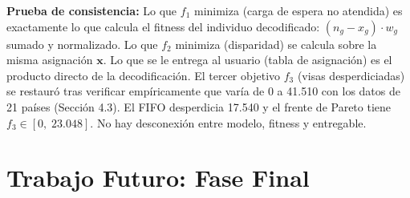 \documentclass[12pt,letterpaper]{article}
\begin{document}
\begin{table}[H]
\centering
\caption{Verificación de coherencia del modelo contra la rúbrica.}
\label{tab:coherencia}
\renewcommand{\arraystretch}{1.5}
\end{table}

\textbf{Prueba de consistencia:} Lo que $f_1$ minimiza (carga de espera no atendida) es exactamente lo que calcula el fitness del individuo decodificado: $(n_g - x_g) \cdot w_g$ sumado y normalizado. Lo que $f_2$ minimiza (disparidad) se calcula sobre la misma asignación $\mathbf{x}$. Lo que se le entrega al usuario (tabla de asignación) es el producto directo de la decodificación. El tercer objetivo $f_3$ (visas desperdiciadas) se restauró tras verificar empíricamente que varía de 0 a 41.510 con los datos de 21 países (Sección 4.3). El FIFO desperdicia 17.540 y el frente de Pareto tiene $f_3 \in [0,\; 23.048]$. No hay desconexión entre modelo, fitness y entregable.


\section{Trabajo Futuro: Fase Final}
\end{document}
